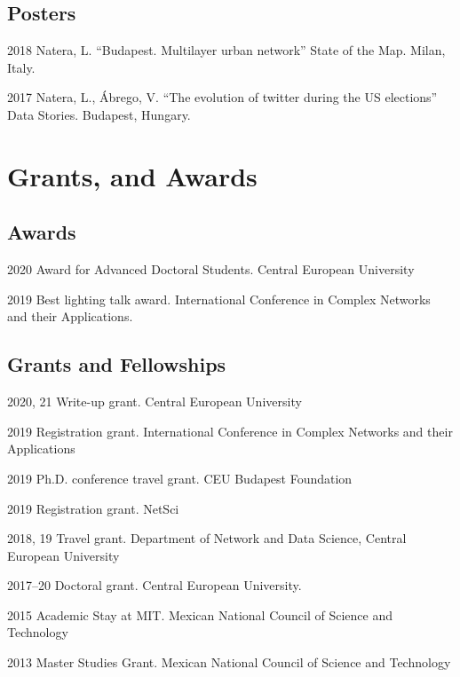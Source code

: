 \documentclass{academiccv}
\begin{document}
\subsection*{Posters}
\begin{tablist}
	\item[2018] \tab Natera, L. \enquote{Budapest. Multilayer urban network} State of the Map. Milan, Italy.
	\item[2017] \tab Natera, L., Ábrego, V. \enquote{The evolution of twitter during the US elections} Data Stories. Budapest, Hungary.
\end{tablist}

\section*{Grants, and Awards}
\subsection*{Awards}
\begin{tablist}
	\item[2020] \tab Award for Advanced Doctoral Students. Central European University 
	\item[2019] \tab Best lighting talk award. International Conference in Complex Networks and their Applications. 
\end{tablist}

\subsection*{Grants and Fellowships}
\begin{tablist}
	\item[2020, 21] \tab Write-up grant. Central European University 
	\item[2019] \tab Registration grant. International Conference in Complex Networks and their Applications
	\item[2019] \tab Ph.D. conference travel grant. CEU Budapest Foundation
	\item[2019] \tab Registration grant. NetSci 
	\item[2018, 19] \tab Travel grant. Department of Network and Data Science, Central European University
	\item[2017--20] \tab Doctoral grant. Central European University. 
	\item[2015] \tab Academic Stay at MIT. Mexican National Council of Science and Technology
	\item[2013] \tab Master Studies Grant. Mexican National Council of Science and Technology
\end{tablist}
\end{document}
